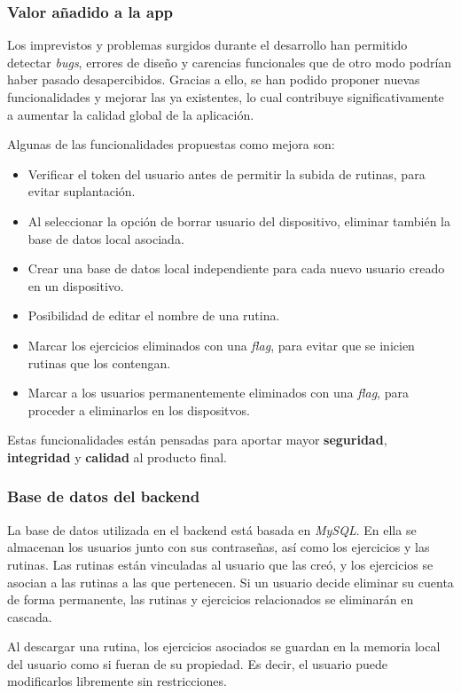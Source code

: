\subsubsection{Valor a\~nadido a la app}
Los imprevistos y problemas surgidos durante el desarrollo han permitido detectar \textit{bugs}, errores de dise\~no y carencias funcionales que de otro modo podr\'ian haber pasado desapercibidos. Gracias a ello, se han podido proponer nuevas funcionalidades y mejorar las ya existentes, lo cual contribuye significativamente a aumentar la calidad global de la aplicaci\'on.

Algunas de las funcionalidades propuestas como mejora son:

\begin{itemize}
  \item Verificar el token del usuario antes de permitir la subida de rutinas, para evitar suplantación.
  \item Al seleccionar la opci\'on de borrar usuario del dispositivo, eliminar tambi\'en la base de datos local asociada.
  \item Crear una base de datos local independiente para cada nuevo usuario creado en un dispositivo.
  \item Posibilidad de editar el nombre de una rutina.
  \item Marcar los ejercicios eliminados con una \textit{flag}, para evitar que se inicien rutinas que los contengan.
  \item Marcar a los usuarios permanentemente eliminados con una \textit{flag}, para proceder a eliminarlos en los dispositvos.
\end{itemize}

Estas funcionalidades est\'an pensadas para aportar mayor \textbf{seguridad}, \textbf{integridad} y \textbf{calidad} al producto final.

\subsubsection{Base de datos del backend}
La base de datos utilizada en el backend está basada en \textit{MySQL}. En ella se almacenan los usuarios junto con sus contraseñas, así como los ejercicios y las rutinas. Las rutinas están vinculadas al usuario que las creó, y los ejercicios se asocian a las rutinas a las que pertenecen. Si un usuario decide eliminar su cuenta de forma permanente, las rutinas y ejercicios relacionados se eliminarán en cascada.

Al descargar una rutina, los ejercicios asociados se guardan en la memoria local del usuario como si fueran de su propiedad. Es decir, el usuario puede modificarlos libremente sin restricciones.

